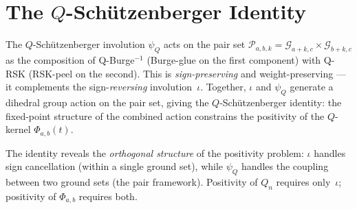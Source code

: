 \documentclass[11pt]{report}
\theoremstyle{plain}
\theoremstyle{definition}
\begin{document}



\chapter{The $Q$-Sch\"utzenberger Identity}
\label{ch:schutzenberger}

The $Q$-Sch\"utzenberger involution $\psi_Q$ acts on the
pair set $\mathcal{P}_{a,b,k} = \mathcal{G}_{a+k,c}
\times \mathcal{G}_{b+k,c}$ as the composition of
Q-Burge$^{-1}$ (Burge-glue on the first component) with
Q-RSK (RSK-peel on the second).  This is
\emph{sign-preserving} and weight-preserving --- it
complements the sign-\emph{reversing} involution~$\iota$.
Together, $\iota$ and $\psi_Q$ generate a dihedral group
action on the pair set, giving the $Q$-Sch\"utzenberger
identity: the fixed-point structure of the combined action
constrains the positivity of the $Q$-kernel $\Phi_{a,b}(t)$.

The identity reveals the \emph{orthogonal structure} of
the positivity problem: $\iota$ handles sign cancellation
(within a single ground set), while $\psi_Q$ handles the
coupling between two ground sets (the pair framework).
Positivity of $Q_n$ requires only~$\iota$;
positivity of $\Phi_{a,b}$ requires both.

\end{document}

